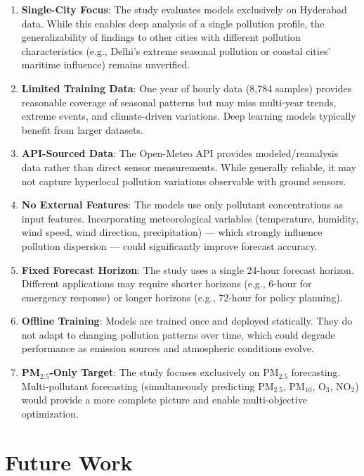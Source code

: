 \begin{enumerate}
    \item \textbf{Single-City Focus}: The study evaluates models exclusively on Hyderabad data. While this enables deep analysis of a single pollution profile, the generalizability of findings to other cities with different pollution characteristics (e.g., Delhi's extreme seasonal pollution or coastal cities' maritime influence) remains unverified.

    \item \textbf{Limited Training Data}: One year of hourly data (8,784 samples) provides reasonable coverage of seasonal patterns but may miss multi-year trends, extreme events, and climate-driven variations. Deep learning models typically benefit from larger datasets.

    \item \textbf{API-Sourced Data}: The Open-Meteo API provides modeled/reanalysis data rather than direct sensor measurements. While generally reliable, it may not capture hyperlocal pollution variations observable with ground sensors.

    \item \textbf{No External Features}: The models use only pollutant concentrations as input features. Incorporating meteorological variables (temperature, humidity, wind speed, wind direction, precipitation) --- which strongly influence pollution dispersion --- could significantly improve forecast accuracy.

    \item \textbf{Fixed Forecast Horizon}: The study uses a single 24-hour forecast horizon. Different applications may require shorter horizons (e.g., 6-hour for emergency response) or longer horizons (e.g., 72-hour for policy planning).

    \item \textbf{Offline Training}: Models are trained once and deployed statically. They do not adapt to changing pollution patterns over time, which could degrade performance as emission sources and atmospheric conditions evolve.

    \item \textbf{PM$_{2.5}$-Only Target}: The study focuses exclusively on PM$_{2.5}$ forecasting. Multi-pollutant forecasting (simultaneously predicting PM$_{2.5}$, PM$_{10}$, O$_3$, NO$_2$) would provide a more complete picture and enable multi-objective optimization.
\end{enumerate}

\section{Future Work}

